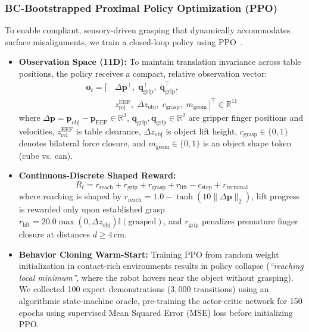 \documentclass[conference]{IEEEtran}
\begin{document}
\subsubsection{BC-Bootstrapped Proximal Policy Optimization (PPO)}
To enable compliant, sensory-driven grasping that dynamically accommodates surface misalignments, we train a closed-loop policy using PPO~\cite{schulman2017proximal}.
\begin{itemize}
    \item \textbf{Observation Space (11D):} To maintain translation invariance across table positions, the policy receives a compact, relative observation vector:
    \begin{align}
        \mathbf{o}_t = \big[\, & \Delta\mathbf{p}^\top,\; \mathbf{q}_{\text{grip}}^\top,\; \dot{\mathbf{q}}_{\text{grip}}^\top, \nonumber \\
        & z_{\text{rel}}^{\text{EEF}},\; \Delta z_{\text{obj}},\; c_{\text{grasp}},\; m_{\text{geom}} \,\big]^\top \in \mathbb{R}^{11}
    \end{align}
    where $\Delta\mathbf{p} = \mathbf{p}_{\text{obj}} - \mathbf{p}_{\text{EEF}} \in \mathbb{R}^3$, $\mathbf{q}_{\text{grip}}, \dot{\mathbf{q}}_{\text{grip}} \in \mathbb{R}^2$ are gripper finger positions and velocities, $z_{\text{rel}}^{\text{EEF}}$ is table clearance, $\Delta z_{\text{obj}}$ is object lift height, $c_{\text{grasp}} \in \{0, 1\}$ denotes bilateral force closure, and $m_{\text{geom}} \in \{0, 1\}$ is an object shape token (cube vs. can).
    
    \item \textbf{Continuous-Discrete Shaped Reward:}
    \begin{equation}
        R_t = r_{\text{reach}} + r_{\text{grip}} + r_{\text{grasp}} + r_{\text{lift}} - c_{\text{step}} + r_{\text{terminal}}
    \end{equation}
    where reaching is shaped by $r_{\text{reach}} = 1.0 - \tanh(10 \|\Delta\mathbf{p}\|_2)$, lift progress is rewarded only upon established grasp $r_{\text{lift}} = 20.0 \max(0, \Delta z_{\text{obj}}) \mathbb{I}(\text{grasped})$, and $r_{\text{grip}}$ penalizes premature finger closure at distances $d \ge 4$\,cm.
    
    \item \textbf{Behavior Cloning Warm-Start:} Training PPO from random weight initialization in contact-rich environments results in policy collapse (\textit{``reaching local minimum''}, where the robot hovers near the object without grasping). We collected 100 expert demonstrations ($3{,}000$ transitions) using an algorithmic state-machine oracle, pre-training the actor-critic network for 150 epochs using supervised Mean Squared Error (MSE) loss before initializing PPO.
\end{itemize}
\end{document}
